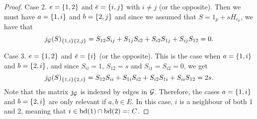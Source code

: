 \begin{proof}
    Case 2. $e = {\left\{1, 2\right\}}$ and $\bar e = {\left\{i, j\right\}}$ with $i \neq j$ (or the opposite). Then we must have $a = {\left\{1, i\right\}}$ and $b = {\left\{2, j\right\}}$ and since we assumed that $S = 1_p + s H_{e_0}$, we have that
    \begin{equation*}
        j_{\mathcal{G}}(S)_{{\left\{1, i\right\}} {\left\{2, j\right\}}} = S_{1 2}S_{i j} + S_{1 j} S_{i 2} + S_{i 2} S_{1 j} + S_{i j} S_{1 2} = 0.
    \end{equation*}

    Case 3. $e = {\left\{1, 2\right\}}$ and $\bar e = {\left\{i\right\}}$ (or the opposite). This is the case when $a = {\left\{1, i\right\}}$ and $b = {\left\{2, i\right\}}$, and since $S_{i i} = 1$, $S_{12} = s$ and $S_{i 1} = S_{i 2} = 0$, we get
    \begin{equation*}
        j_{\mathcal{G}}(S)_{{\left\{1, i\right\}} {\left\{2, i\right\}}} = 
        S_{1 2}S_{i i} + S_{1 i} S_{i 2} + S_{i 2} S_{1 i} + S_{i i} S_{1 2} = 2 s.
    \end{equation*}
    Note that the matrix $j_{\mathcal{G}}$ is indexed by edges in ${\mathcal{G}}$. Therefore, the cases $a = {\left\{1, i\right\}}$ and $b = {\left\{2, i\right\}}$ are only relevant if $a, b \in E$. In this case, $i$ is a neighbour of both 1 and 2, meaning that $i \in {\textrm{bd}}(1) \cap {\textrm{bd}}(2) =: C$.


\end{proof}
